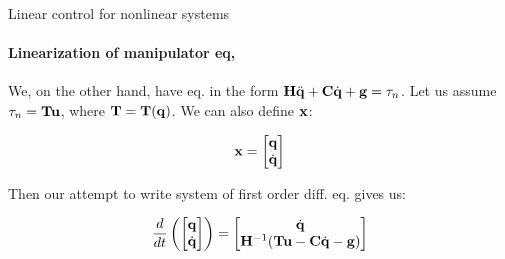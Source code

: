 \documentclass{beamer}
\begin{document}
\begin{frame}{Linear control for nonlinear systems}
\framesubtitle{Linearization of manipulator eq,}
\begin{flushleft}

We, on the other hand, have eq. in the form $\mathbf{H} \ddot{\mathbf{q}} + \mathbf{C} \dot{\mathbf{q}} + \mathbf{g} = \tau_n$. Let us assume $\tau_n = \mathbf{T}\mathbf{u}$, where $\mathbf{T} = \mathbf{T}(\mathbf{q})$. We can also define $\mathbf{x}$:

\begin{equation}
    \mathbf{x} = \begin{bmatrix}
    \mathbf{q} \\ \dot{\mathbf{q}} \end{bmatrix}
\end{equation}

Then our attempt to write system of first order diff. eq. gives us:

\begin{equation}
    \frac{d}{dt} 
    \left(
    \begin{bmatrix}
    \mathbf{q} \\ \dot{\mathbf{q}} 
    \end{bmatrix}
    \right)
    =
    \begin{bmatrix}
    \dot{\mathbf{q}}  \\ 
    \mathbf{H}^{-1} (\mathbf{T}\mathbf{u} -  \mathbf{C} \dot{\mathbf{q}} - \mathbf{g}) 
    \end{bmatrix}
\end{equation}

\end{flushleft}
\end{frame}
\end{document}
